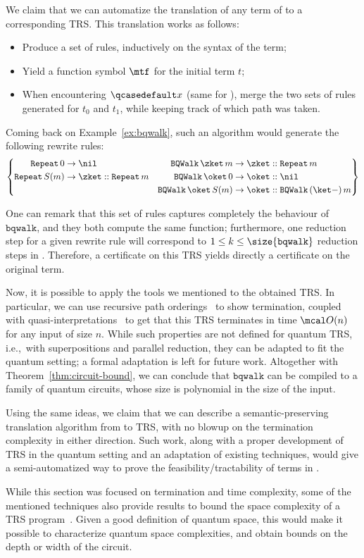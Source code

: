 We claim that we can automatize the translation of any term of \hyrql{} to a
corresponding TRS. This translation works as follows:

\begin{itemize}
  \item Produce a set of rules, inductively on the syntax of the term;
  \item Yield a function symbol $\mtf$ for the initial term $t$;
  \item When encountering $\qcasedefault x$ (same for \textmatch{}), merge the 
    two sets of rules generated for $t_0$ and $t_1$, while keeping track of
    which path was taken.
\end{itemize}

Coming back on Example~\ref{ex:bqwalk}, such an algorithm would generate the
following rewrite rules:
\[
  \left\{
    \begin{aligned}
      \mathtt{Repeat}\,0 &\to \nil   &\mathtt{BQWalk}\,\zket\,m &\to \zket ::
      \mathtt{Repeat}\,m \\
      \mathtt{Repeat}\,S(m) &\to \zket:: \mathtt{Repeat}\,m  &
      \mathtt{BQWalk}\,\oket\,0 &\to \oket :: \nil \\
      & &     \mathtt{BQWalk}\,\oket\,S(m) &\to \oket ::
      \mathtt{BQWalk}\,(\ket -)\,m
    \end{aligned}
  \right\}
\]

One can remark that this set of rules captures completely
the behaviour of $\mathtt{bqwalk}$, and they both compute the same function;
furthermore, one reduction step for a given rewrite rule will correspond to
$1 \leq k \leq \size{\mathtt{bqwalk}}$ reduction steps in \hyrql{}.
Therefore, a certificate on this TRS yields directly a certificate on the
original term. 

Now, it is possible to apply the tools we mentioned to the obtained TRS. In
particular, we can use recursive path orderings~\cite{Der82} to show
termination, coupled with quasi-interpretations~\cite{BMM11} to get that this
TRS terminates in time $\mcal O(n)$ for any input of size $n$. While such
properties are not defined for quantum TRS, i.e.,\ with superpositions and
parallel reduction, they can be adapted to fit the quantum setting; a formal
adaptation is left for future work. Altogether with
Theorem~\ref{thm:circuit-bound}, we can conclude that
$\mathtt{bqwalk}$ can be compiled to a family of quantum circuits, whose size
is polynomial in the size of the input.

Using the same ideas, we claim that we can describe a semantic-preserving
translation algorithm from \hyrql{} to TRS, with no blowup on the termination
complexity in either direction. Such work, along with a proper development of
TRS in the quantum setting and an adaptation of existing techniques, would give
a semi-automatized way to prove the feasibility/tractability of terms in
\hyrql{}.

While this section was focused on termination and time complexity, some of the
mentioned techniques also provide results to bound the space complexity of a
TRS program~\cite{BMM11}. Given a good definition of quantum space, this would
make it possible to characterize quantum space complexities, and obtain bounds
on the depth or width of the circuit.
